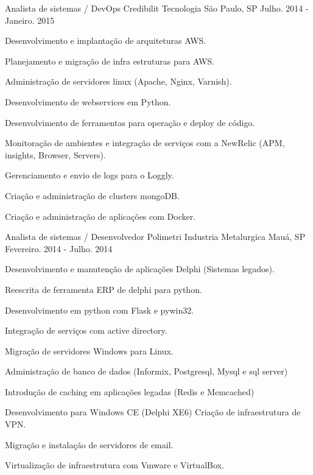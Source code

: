 \begin{cventries}
  \cventry
    {Analista de sistemas / DevOps} %
    {Credibilit Tecnologia} %
    {São Paulo, SP} %
    {Julho. 2014 - Janeiro. 2015} %
    {
      \begin{cvitems} %
        \item {Desenvolvimento e implantação de arquiteturas AWS.}
        \item {Planejamento e migração de infra estruturas para AWS.}
        \item {Administração de servidores linux (Apache, Nginx, Varnish).}
        \item {Desenvolvimento de webservices em Python.}
        \item {Desenvolvimento de ferramentas para operação e deploy de código.}
        \item {Monitoração de ambientes e integração de serviços com a NewRelic (APM, insights, Browser, Servers).}
        \item {Gerenciamento e envio de logs para o Loggly.}
        \item {Criação e administração de clusters mongoDB.}
        \item {Criação e administração de aplicações com Docker.}
      \end{cvitems}
    }

  \cventry
    {Analista de sistemas / Desenvolvedor} %
    {Polimetri Industria Metalurgica} %
    {Mauá, SP} %
    {Fevereiro. 2014 - Julho. 2014} %
    {
      \begin{cvitems} %
          \item {Desenvolvimento e manutenção de aplicações Delphi (Sistemas legados).}
          \item {Reescrita de ferramenta ERP de delphi para python.}
          \item {Desenvolvimento em python com Flask e pywin32.}
          \item {Integração de serviços com active directory.}
          \item {Migração de servidores Windows para Linux.}
          \item {Administração de banco de dados (Informix, Postgresql, Mysql e sql server)}
          \item {Introdução de caching em aplicações legadas (Redis e Memcached)}
          \item {Desenvolvimento para Windows CE (Delphi XE6) Criação de infraestrutura de VPN.}
          \item {Migração e instalação de servidores de email.}
          \item {Virtualização de infraestrutura com Vmware e VirtualBox.}
      \end{cvitems}
    }


\end{cventries}

